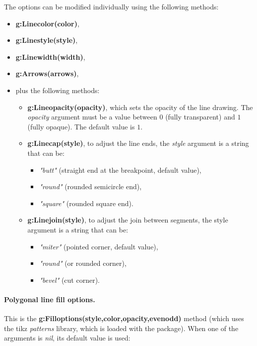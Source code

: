 The options can be modified individually using the following methods:
\begin{itemize}
    \item \textbf{g:Linecolor(color)},
    \item \textbf{g:Linestyle(style)},
    \item \textbf{g:Linewidth(width)},
    \item \textbf{g:Arrows(arrows)},
    \item plus the following methods:
\begin{itemize}
    \item \textbf{g:Lineopacity(opacity)}, which sets the opacity of the line drawing. The \emph{opacity} argument must be a value between $0$ (fully transparent) and $1$ (fully opaque). The default value is $1$.     \item \textbf{g:Linecap(style)}, to adjust the line ends, the \emph{style} argument is a string that can be:
\begin{itemize}
    \item \emph{"butt"} (straight end at the breakpoint, default value),
    \item \emph{"round"} (rounded semicircle end),
    \item \emph{"square"} (rounded square end).
\end{itemize}

    \item \textbf{g:Linejoin(style)}, to adjust the join between segments, the style argument is a string that can be:
\begin{itemize}
    \item \emph{"miter"} (pointed corner, default value),
    \item \emph{"round"} (or rounded corner),
    \item \emph{"bevel"} (cut corner).
\end{itemize} 
\end{itemize}
\end{itemize}

\paragraph{Polygonal line fill options.}

This is the \textbf{g:Filloptions(style,color,opacity,evenodd)} method (which uses the tikz \emph{patterns} library, which is loaded with the package). When one of the arguments is \emph{nil}, its default value is used:

